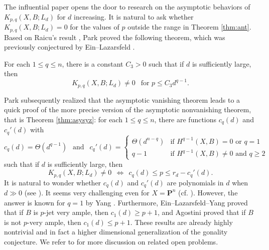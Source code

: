 \documentclass[graybox]{svmult}
\def\nP{\mathbf{P}}
\begin{document}
The influential paper \cite{EL2} opens the door to research on the asymptotic behaviors of $K_{p,q}(X, B; L_d)$ for $d$ increasing. It is natural to ask whether $K_{p,q}(X, B; L_d)=0$ for the values of $p$ outside the range in Theorem \ref{thm:ant}. Based on Raicu's result \cite[Appendix]{Raicu}, Park \cite[Theorem 1.1]{Park1} proved the following theorem, which was previously conjectured by Ein--Lazarsfeld \cite[Conjecture 7.1]{EL2}. 

\begin{theorem}\label{thm:avt}
For each $1 \leq q \leq n$, there is a constant $C_3 > 0$ such that if $d$ is sufficiently large, then
$$
K_{p,q}(X, B; L_d) \neq 0~~\text{ for $p \leq C_3 d^{q-1}$}.
$$
\end{theorem}

Park \cite{Park3} subsequently realized that the asymptotic vanishing theorem leads to a quick proof of the more precise version of the asymptotic nonvanishing theorem, that is Theorem \ref{thm:asysyz}: for each $1 \leq q \leq n$, there are functions $c_q(d)$ and $c_q'(d)$ with
\begin{equation}\label{eq:c_qc_q'}
c_q(d) = \Theta(d^{q-1})~~\text{ and }~~c_q'(d) = \begin{cases} \Theta(d^{n-q}) & \text{if $H^{q-1}(X, B) =0$ or $q=1$} \\  q-1 & \text{if $H^{q-1}(X, B) \neq 0$ and $q \geq 2$} \end{cases}
\end{equation}
such that if $d$ is sufficiently large, then
$$
K_{p,q}(X, B; L_d) \neq 0~~\Longleftrightarrow~~c_q(d) \leq p \leq r_d-c_q'(d).
$$
It is natural to wonder whether $c_q(d)$ and $c_q'(d)$ are polynomials in $d$ when $d \gg 0$ (see \cite[Question 5.5]{Park3}). It seems very challenging even for $X=\nP^n$ (cf. \cite[Conjecture 2.3]{EL3}). However, the answer is known for $q=1$ by Yang \cite[Theorem 1]{DavidYang}. Furthermore, Ein--Lazarsfeld--Yang \cite[Theorem A]{ELY} proved that if $B$ is $p$-jet very ample, then $c_1(d) \geq p+1$, and Agostini \cite[Theorem A]{Agostini2} proved that if $B$ is not $p$-very ample, then $c_1(d) \leq p+1$. These results are already highly nontrivial and in fact a higher dimensional generalization of the gonality conjecture. We refer to \cite[Section 5]{Park3} for more discussion on related open problems.
\end{document}
